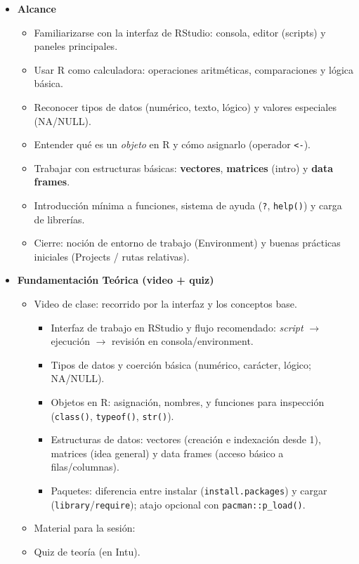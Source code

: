 \documentclass{article}
\begin{document}
\begin{itemize}
\item \textbf{Alcance}
\begin{itemize}
  \item Familiarizarse con la interfaz de RStudio: consola, editor (scripts) y paneles principales.
  \item Usar R como calculadora: operaciones aritméticas, comparaciones y lógica básica.
  \item Reconocer tipos de datos (numérico, texto, lógico) y valores especiales (NA/NULL).
  \item Entender qué es un \emph{objeto} en R y cómo asignarlo (operador \texttt{<-}).
  \item Trabajar con estructuras básicas: \textbf{vectores}, \textbf{matrices} (intro) y \textbf{data frames}.
  \item Introducción mínima a funciones, sistema de ayuda (\texttt{?}, \texttt{help()}) y carga de librerías.
  \item Cierre: noción de entorno de trabajo (Environment) y buenas prácticas iniciales (Projects / rutas relativas).
\end{itemize}

\item \textbf{Fundamentación Teórica (video + quiz)}
\begin{itemize}
  \item Video de clase: recorrido por la interfaz y los conceptos base. %
  \begin{itemize}
    \item Interfaz de trabajo en RStudio y flujo recomendado: \emph{script} $\rightarrow$ ejecución $\rightarrow$ revisión en consola/environment.
    \item Tipos de datos y coerción básica (numérico, carácter, lógico; NA/NULL).
    \item Objetos en R: asignación, nombres, y funciones para inspección (\texttt{class()}, \texttt{typeof()}, \texttt{str()}).
    \item Estructuras de datos: vectores (creación e indexación desde 1), matrices (idea general) y data frames (acceso básico a filas/columnas).
    \item Paquetes: diferencia entre instalar (\texttt{install.packages}) y cargar (\texttt{library}/\texttt{require}); atajo opcional con \texttt{pacman::p\_load()}.
  \end{itemize}
  \item Material para la sesión: %
  \item Quiz de teoría (en Intu).
\end{itemize}


\end{itemize}
\end{document}
